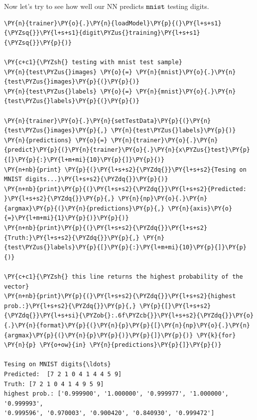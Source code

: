 Now let's try to see how well our NN predicts \(\tt{mnist}\) testing
digits.

\begin{codebox}[breakable, size=fbox, boxrule=1pt, pad at break*=1mm,colback=cellbackground, colframe=cellborder]
\begin{Verbatim}[commandchars=\\\{\}]
\PY{n}{trainer}\PY{o}{.}\PY{n}{loadModel}\PY{p}{(}\PY{l+s+s1}{\PYZsq{}}\PY{l+s+s1}{digit\PYZus{}training}\PY{l+s+s1}{\PYZsq{}}\PY{p}{)}
	
\PY{c+c1}{\PYZsh{} testing with mnist test sample}
\PY{n}{test\PYZus{}images} \PY{o}{=} \PY{n}{mnist}\PY{o}{.}\PY{n}{test\PYZus{}images}\PY{p}{(}\PY{p}{)}
\PY{n}{test\PYZus{}labels} \PY{o}{=} \PY{n}{mnist}\PY{o}{.}\PY{n}{test\PYZus{}labels}\PY{p}{(}\PY{p}{)}
	
\PY{n}{trainer}\PY{o}{.}\PY{n}{setTestData}\PY{p}{(}\PY{n}{test\PYZus{}images}\PY{p}{,} \PY{n}{test\PYZus{}labels}\PY{p}{)}
\PY{n}{predictions} \PY{o}{=} \PY{n}{trainer}\PY{o}{.}\PY{n}{predict}\PY{p}{(}\PY{n}{trainer}\PY{o}{.}\PY{n}{x\PYZus{}test}\PY{p}{[}\PY{p}{:}\PY{l+m+mi}{10}\PY{p}{]}\PY{p}{)}
\PY{n+nb}{print} \PY{p}{(}\PY{l+s+s2}{\PYZdq{}}\PY{l+s+s2}{Tesing on MNIST digits...}\PY{l+s+s2}{\PYZdq{}}\PY{p}{)}
\PY{n+nb}{print}\PY{p}{(}\PY{l+s+s2}{\PYZdq{}}\PY{l+s+s2}{Predicted: }\PY{l+s+s2}{\PYZdq{}}\PY{p}{,} \PY{n}{np}\PY{o}{.}\PY{n}{argmax}\PY{p}{(}\PY{n}{predictions}\PY{p}{,} \PY{n}{axis}\PY{o}{=}\PY{l+m+mi}{1}\PY{p}{)}\PY{p}{)} 
\PY{n+nb}{print}\PY{p}{(}\PY{l+s+s2}{\PYZdq{}}\PY{l+s+s2}{Truth:}\PY{l+s+s2}{\PYZdq{}}\PY{p}{,} \PY{n}{test\PYZus{}labels}\PY{p}{[}\PY{p}{:}\PY{l+m+mi}{10}\PY{p}{]}\PY{p}{)}
	
\PY{c+c1}{\PYZsh{} this line returns the highest probability of the vector}
\PY{n+nb}{print}\PY{p}{(}\PY{l+s+s2}{\PYZdq{}}\PY{l+s+s2}{highest prob.:}\PY{l+s+s2}{\PYZdq{}}\PY{p}{,} \PY{p}{[}\PY{l+s+s2}{\PYZdq{}}\PY{l+s+si}{\PYZob{}:.6f\PYZcb{}}\PY{l+s+s2}{\PYZdq{}}\PY{o}{.}\PY{n}{format}\PY{p}{(}\PY{n}{p}\PY{p}{[}\PY{n}{np}\PY{o}{.}\PY{n}{argmax}\PY{p}{(}\PY{n}{p}\PY{p}{)}\PY{p}{]}\PY{p}{)} \PY{k}{for} \PY{n}{p} \PY{o+ow}{in} \PY{n}{predictions}\PY{p}{]}\PY{p}{)}

Tesing on MNIST digits{\ldots}
Predicted:  [7 2 1 0 4 1 4 4 5 9]
Truth: [7 2 1 0 4 1 4 9 5 9]
highest prob.: ['0.999900', '1.000000', '0.999977', '1.000000', '0.999993',
'0.999596', '0.970003', '0.900420', '0.840930', '0.999472']
\end{Verbatim}
\end{codebox}

